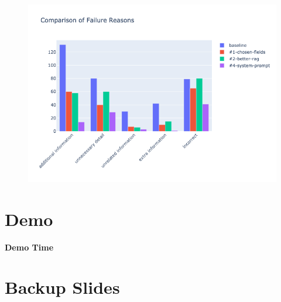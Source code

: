 \documentclass{sdqbeamer}[smallfoot]
\begin{document}
\begin{frame}[t]
\begin{figure}
	    \centering
    \vspace{-0.5cm}
    \includegraphics[width=0.80\linewidth]{images/failure_reason_plot.png}
	\end{figure}
\end{frame}

\section{Demo}
\begin{frame}{}
    \vspace{1.5cm}
    \centering
    \fontsize{100pt}{55pt}\selectfont \textcolor{kit-green100}{\textbf{Demo Time}}
\end{frame}

\appendix
\beginbackup

\section{Backup Slides}
\begin{frame}{}
    \vspace{1.5cm}
    \centering
    \fontsize{60pt}{55pt}
\end{frame}
\end{document}
